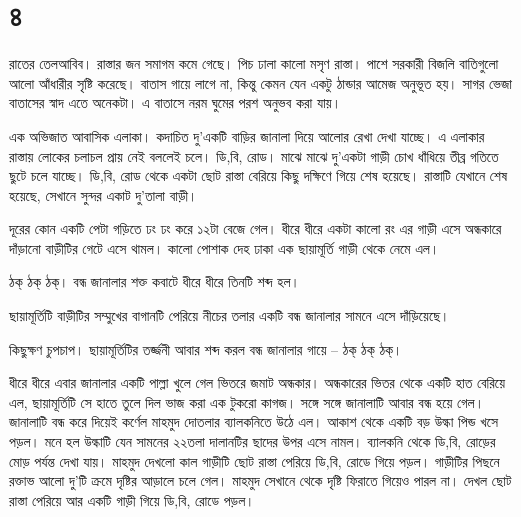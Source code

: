 \documentclass[
]{book}
\begin{document}
\section*{৪}\label{ota-1-4}

রাতের তেলআবিব। রাস্তার জন সমাগম কমে গেছে। পিচ ঢালা কালো মসৃণ রাস্তা। পাশে সরকারী বিজলি বাতিগুলো আলো আঁধারীর সৃষ্টি করেছে। বাতাস গায়ে লাগে না, কিন্তু কেমন যেন একটু ঠান্ডার আমেজ অনুভূত হয়। সাগর ভেজা বাতাসের স্বাদ এতে অনেকটা। এ বাতাসে নরম ঘুমের পরশ অনুভব করা যায়।

এক অভিজাত আবাসিক এলাকা। কদাচিত দু'একটি বাড়ির জানালা দিয়ে আলোর রেখা দেখা যাচ্ছে। এ এলাকার রাস্তায় লোকের চলাচল প্রায় নেই বললেই চলে। ডি,বি, রোড। মাঝে মাঝে দু'একটা গাড়ী চোখ ধাঁধিয়ে তীব্র গতিতে ছুটে চলে যাচ্ছে। ডি,বি, রোড থেকে একটা ছোট রাস্তা বেরিয়ে কিছু দক্ষিণে গিয়ে শেষ হয়েছে। রাস্তাটি যেখানে শেষ হয়েছে, সেখানে সুন্দর একাট দু'তালা বাড়ী।

দূরের কোন একটি পেটা গড়িতে ঢং ঢং করে ১২টা বেজে গেল। ধীরে ধীরে একটা কালো রং এর গাড়ী এসে অন্ধকারে দাঁড়ানো বাড়ীটির গেটে এসে থামল। কালো পোশাক দেহ ঢাকা এক ছায়ামূর্তি গাড়ী থেকে নেমে এল।

ঠক্ ঠক্ ঠক্। বন্ধ জানালার শক্ত কবাটে ধীরে ধীরে তিনটি শব্দ হল।

ছায়ামূর্তিটি বাড়ীটির সম্মুখের বাগানটি পেরিয়ে নীচের তলার একটি বন্ধ জানালার সামনে এসে দাঁড়িয়েছে।

কিছুক্ষণ চুপচাপ। ছায়ামূর্তিটির তর্জ্জনী আবার শব্দ করল বন্ধ জানালার গায়ে -- ঠক্ ঠক্ ঠক্।

ধীরে ধীরে এবার জানালার একটি পাল্লা খুলে গেল ভিতরে জমাট অন্ধকার। অন্ধকারের ভিতর থেকে একটি হাত বেরিয়ে এল, ছায়ামূর্তিটি সে হাতে তুলে দিল ভাজ করা এক টুকরো কাগজ। সঙ্গে সঙ্গে জানালাটি আবার বন্ধ হয়ে গেল। জানালাটি বন্ধ করে দিয়েই কর্ণেল মাহমুদ দোতলার ব্যালকনিতে উঠে এল। আকাশ থেকে একটি বড় উল্কা পিন্ড খসে পড়ল। মনে হল উল্কাটি যেন সামনের ২২তলা দালানটির ছাদের উপর এসে নামল। ব্যালকনি থেকে ডি,বি, রোড়ের মোড় পর্যন্ত দেখা যায়। মাহমুদ দেখলো কাল গাড়ীটি ছোট রাস্তা পেরিয়ে ডি,বি, রোডে গিয়ে পড়ল। গাড়ীটির পিছনে রক্তাভ আলো দু'টি ক্রমে দৃষ্টির আড়ালে চলে গেল। মাহমুদ সেখানে থেকে দৃষ্টি ফিরাতে গিয়েও পারল না। দেখল ছোট রাস্তা পেরিয়ে আর একটি গাড়ী গিয়ে ডি,বি, রোডে পড়ল।
\end{document}
